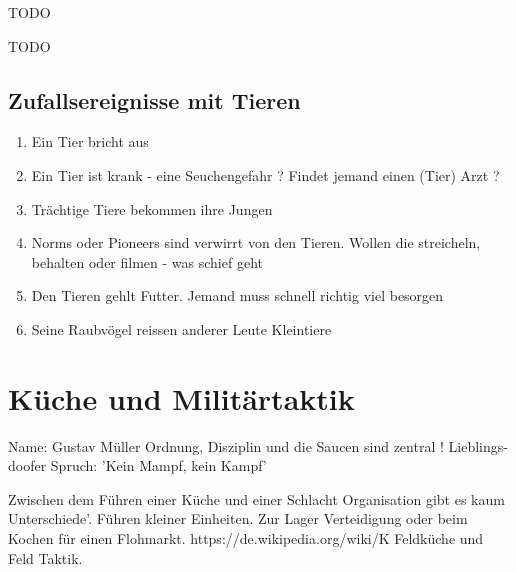 \begin{npcBox}[title=Jonas Ohnesorg]
    \begin{consequences}
    \item {}
    \item {}
    \item {}
    \end{consequences}

    \begin{npcDescription}
    TODO
    \end{npcDescription}


    \begin{equipment}
    \item TODO
    \end{equipment}
\end{npcBox}


\subsection{Zufallsereignisse mit Tieren}

\begin{enumerate}
\item Ein Tier bricht aus
\item Ein Tier ist krank - eine Seuchengefahr ? Findet jemand einen (Tier) Arzt ?
\item Trächtige Tiere bekommen ihre Jungen
\item Norms oder Pioneers sind verwirrt von den Tieren. Wollen die streicheln, behalten oder filmen - was schief geht
\item Den Tieren gehlt Futter. Jemand muss schnell richtig viel besorgen
\item Seine Raubvögel reissen anderer Leute Kleintiere
\end{enumerate}

\newpage
\section{Küche und Militärtaktik}

Name: Gustav Müller
Ordnung, Disziplin und die Saucen sind zentral !
Lieblings-doofer Spruch: 'Kein Mampf, kein Kampf'

Zwischen dem Führen einer Küche und einer Schlacht Organisation gibt es kaum Unterschiede'. Führen kleiner Einheiten. Zur Lager Verteidigung oder beim Kochen für einen Flohmarkt. https://de.wikipedia.org/wiki/K%
Feldküche und Feld Taktik.

